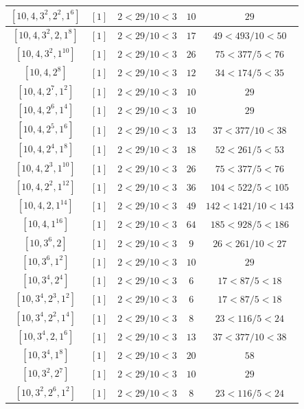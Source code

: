 \documentclass{article}%
\begin{document}
\begin{center}
\begin{longtable}{||c|c|c|c|c||}
$[10, 4, 3^{2}, 2^{2}, 1^{6}]$ & $[1]$ & $2 < 29/10 < 3$ & $10$ & $29$ \\ \hline 
$[10, 4, 3^{2}, 2, 1^{8}]$ & $[1]$ & $2 < 29/10 < 3$ & $17$ & $49 < 493/10 < 50$ \\ \hline 
$[10, 4, 3^{2}, 1^{10}]$ & $[1]$ & $2 < 29/10 < 3$ & $26$ & $75 < 377/5 < 76$ \\ \hline 
$[10, 4, 2^{8}]$ & $[1]$ & $2 < 29/10 < 3$ & $12$ & $34 < 174/5 < 35$ \\ \hline 
$[10, 4, 2^{7}, 1^{2}]$ & $[1]$ & $2 < 29/10 < 3$ & $10$ & $29$ \\ \hline 
$[10, 4, 2^{6}, 1^{4}]$ & $[1]$ & $2 < 29/10 < 3$ & $10$ & $29$ \\ \hline 
$[10, 4, 2^{5}, 1^{6}]$ & $[1]$ & $2 < 29/10 < 3$ & $13$ & $37 < 377/10 < 38$ \\ \hline 
$[10, 4, 2^{4}, 1^{8}]$ & $[1]$ & $2 < 29/10 < 3$ & $18$ & $52 < 261/5 < 53$ \\ \hline 
$[10, 4, 2^{3}, 1^{10}]$ & $[1]$ & $2 < 29/10 < 3$ & $26$ & $75 < 377/5 < 76$ \\ \hline 
$[10, 4, 2^{2}, 1^{12}]$ & $[1]$ & $2 < 29/10 < 3$ & $36$ & $104 < 522/5 < 105$ \\ \hline 
$[10, 4, 2, 1^{14}]$ & $[1]$ & $2 < 29/10 < 3$ & $49$ & $142 < 1421/10 < 143$ \\ \hline 
$[10, 4, 1^{16}]$ & $[1]$ & $2 < 29/10 < 3$ & $64$ & $185 < 928/5 < 186$ \\ \hline 
$[10, 3^{6}, 2]$ & $[1]$ & $2 < 29/10 < 3$ & $9$ & $26 < 261/10 < 27$ \\ \hline 
$[10, 3^{6}, 1^{2}]$ & $[1]$ & $2 < 29/10 < 3$ & $10$ & $29$ \\ \hline 
$[10, 3^{4}, 2^{4}]$ & $[1]$ & $2 < 29/10 < 3$ & $6$ & $17 < 87/5 < 18$ \\ \hline 
$[10, 3^{4}, 2^{3}, 1^{2}]$ & $[1]$ & $2 < 29/10 < 3$ & $6$ & $17 < 87/5 < 18$ \\ \hline 
$[10, 3^{4}, 2^{2}, 1^{4}]$ & $[1]$ & $2 < 29/10 < 3$ & $8$ & $23 < 116/5 < 24$ \\ \hline 
$[10, 3^{4}, 2, 1^{6}]$ & $[1]$ & $2 < 29/10 < 3$ & $13$ & $37 < 377/10 < 38$ \\ \hline 
$[10, 3^{4}, 1^{8}]$ & $[1]$ & $2 < 29/10 < 3$ & $20$ & $58$ \\ \hline 
$[10, 3^{2}, 2^{7}]$ & $[1]$ & $2 < 29/10 < 3$ & $10$ & $29$ \\ \hline 
$[10, 3^{2}, 2^{6}, 1^{2}]$ & $[1]$ & $2 < 29/10 < 3$ & $8$ & $23 < 116/5 < 24$ \\ \hline 

\end{longtable}
\end{center}
\end{document}
